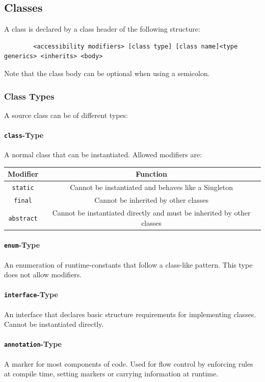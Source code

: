 \documentclass{docs}
\begin{document}
    \subsection{Classes}
    A class is declared by a class header of the following structure:
    \begin{verbatim}
        <accessibility modifiers> [class type] [class name]<type generics> <inherits> <body>
    \end{verbatim}
    Note that the class body can be optional when using a semicolon.
    
    \subsubsection{Class Types}
    A source class can be of different types:
    
    \paragraph{\texttt{class}-Type}
    A normal class that can be instantiated.
    Allowed modifiers are:
    \begin{center}
    \begin{tabular}{c|c}
        Modifier & Function \\
        \hline
        \texttt{static} & Cannot be instantiated and behaves like a Singleton \\
        \texttt{final} & Cannot be inherited by other classes \\
        \texttt{abstract} & Cannot be instantiated directly and must be inherited by other classes
    \end{tabular}
    \end{center}
    
    \paragraph{\texttt{enum}-Type}
    An enumeration of runtime-constants that follow a class-like pattern.
    This type does not allow modifiers.
    
    \paragraph{\texttt{interface}-Type}
    An interface that declares basic structure requirements for implementing classes.
    Cannot be instantiated directly.
    
    \paragraph{\texttt{annotation}-Type}
    A marker for most components of code. Used for flow control by enforcing rules at compile time, setting markers or carrying information at runtime.
    
\end{document}
